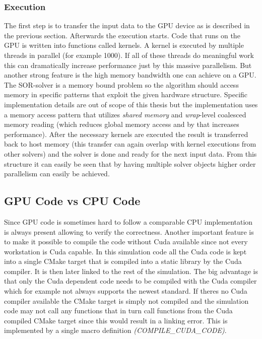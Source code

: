 \documentclass[master.tex]{subfiles}
\begin{document}
\subsubsection{Execution}
The first step is to transfer the input data to the GPU device as is described in the previous section. Afterwards the execution starts.\newline
Code that runs on the GPU is written into functions called kernels. A kernel is executed by multiple threads in parallel (for example 1000). If all of these threads do meaningful work this can dramatically increase performance just by this massive parallelism. But another strong feature is the high memory bandwidth one can achieve on a GPU. The \ac{SOR}-solver is a memory bound problem so the algorithm should access memory in specific patterns that exploit the given hardware structure. Specific implementation details are out of scope of this thesis but the implementation uses a memory access pattern that utilizes \textit{shared memory} and \textit{wrap}-level coalesced memory reading (which reduces global memory access and by that increases performance).\newline
After the necessary kernels are executed the result is transferred back to host memory (this transfer can again overlap with kernel executions from other solvers) and the solver is done and ready for the next input data.\newline
From this structure it can easily be seen that by having multiple solver objects higher order parallelism can easily be achieved.


\subsection{GPU Code vs CPU Code}
Since GPU code is sometimes hard to follow a comparable CPU implementation is always present allowing to verify the correctness.\newline
Another important feature is to make it possible to compile the code without Cuda available since not every workstation is Cuda capable. In this simulation code all the Cuda code is kept into a single CMake target that is compiled into a static library by the Cuda compiler. It is then later linked to the rest of the simulation. The big advantage is that only the Cuda dependent code needs to be compiled with the Cuda compiler which for example not always supports the newest standard. If theres no Cuda compiler available the CMake target is simply not compiled and the simulation code may not call any functions that in turn call functions from the Cuda compiled CMake target since this would result in a linking error. This is implemented by a single macro definition \textit{(COMPILE\_CUDA\_CODE)}.
\end{document}
